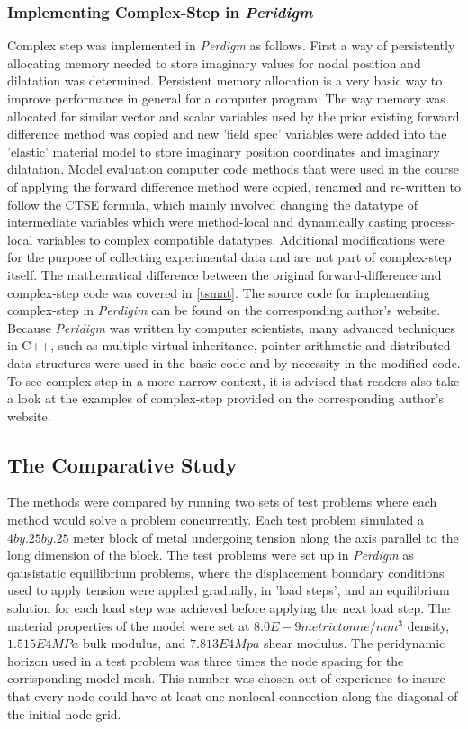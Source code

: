 \documentclass[preprint,12pt]{elsarticle}
\begin{document}
\subsubsection{Implementing Complex-Step in \emph{Peridigm}} 

Complex step was implemented in \emph{Perdigm} as follows. First a way of persistently allocating
memory needed to store imaginary values for nodal position and dilatation was determined. Persistent
memory allocation is a very basic way to improve performance in general for a computer program. The way
memory was allocated for similar vector and scalar variables used by the prior existing forward
difference method was copied and new 'field spec' variables were added into the 'elastic' material
model to store imaginary position coordinates and imaginary dilatation. Model evaluation computer
code methods that were used in the course of applying the forward difference method were copied,
renamed and re-written to follow the CTSE formula, which mainly involved changing the datatype of
intermediate variables which were method-local and dynamically casting process-local variables to
complex compatible datatypes. Additional modifications were for the purpose of collecting
experimental data and are not part of complex-step itself. The mathematical difference between the
original forward-difference and complex-step code was covered in \ref{tsmat}. The source code for
implementing complex-step in \emph{Perdigim} can be found on the corresponding author's website. Because
\emph{Peridigm} was written by computer scientists, many advanced techniques in C++, such as
multiple virtual inheritance, pointer arithmetic and distributed data structures were used in the
basic code and by necessity in the modified code. To see complex-step in a more narrow context, it
is advised that readers also take a look at the examples of complex-step provided on the
corresponding author's website.

\subsection{The Comparative Study} 

The methods were compared by running two sets of test problems where each method would solve a
problem concurrently. Each test problem simulated a $4 by .25 by .25$ meter block of metal
undergoing tension along the axis parallel to the long dimension of the block. The test problems
were set up in \emph{Perdigm} as qausistatic equillibrium problems, where the displacement boundary
conditions used to apply tension were applied gradually, in 'load steps', and an equilibrium
solution for each load step was achieved before applying the next load step. The material properties
of the model were set at $8.0E-9 metric tonne/ mm^3$ density, $1.515E4 MPa$ bulk modulus, and
$7.813E4 Mpa$ shear modulus. The peridynamic horizon used in a test problem was three times the node
spacing for the corrisponding model mesh. This number was chosen out of experience to insure that
every node could have at least one nonlocal connection along the diagonal of the initial node grid.
\end{document}
